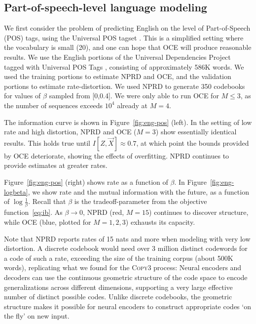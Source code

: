 \documentclass[11pt,letterpaper]{article}
\newif \ifcomment
\newcommand\rljf[1]{\ifcomment{{\color{blue}(#1)}}\else{}\fi}
\begin{document}



\rljf{Some motivation for why this is cool and interesting, maybe in parallel with the Bentz et al entropy paper, and other information theoretic linguistic complexity papers like Koplenig et al, and Dembowski's work}

\subsection{Part-of-speech-level language modeling}

We first consider the problem of predicting English on the level of Part-of-Speech (POS) tags, using the Universal POS tagset \citep{petrov-universal-2012}. 
This is a simplified setting where the vocabulary is small (20), and one can hope that OCE will produce reasonable results.
We use the English portions of the Universal Dependencies Project~\citep{nivre-universal-2017} tagged with Universal POS Tags \citep{petrov-universal-2012}, consisting of approximately 586K words.
We used the training portions to estimate NPRD and OCE, and the validation portions to estimate rate-distortion.
We used NPRD to generate 350 codebooks for values of $\beta$ sampled from [0,0.4].
We were only able to run OCE for $M \leq 3$, as the number of sequences exceeds $10^4$ already at $M=4$.


The information curve is shown in Figure~\ref{fig:eng-pos} (left).
In the setting of low rate and high distortion, NPRD and OCE ($M=3$) show essentially identical results.
This holds true until $I[Z, \overrightarrow{X}] \approx 0.7$, at which point the bounds provided by OCE deteriorate, showing the effects of overfitting.
NPRD continues to provide estimates at greater rates.

Figure~\ref{fig:eng-pos} (right) shows rate as a function of $\beta$.
In Figure~\ref{fig:eng-logbeta}, we show rate and the mutual information with the future, as a function of $\log \frac{1}{\beta}$.
Recall that $\beta$ is the tradeoff-parameter from the objective function~\ref{eq:ib}.
As $\beta \rightarrow 0$, NPRD (red, $M=15$) continues to discover structure, while OCE (blue, plotted for $M=1,2,3$) exhausts its capacity.

Note that NPRD reports rates of 15 nats and more when modeling with very low distortion.
A discrete codebook would need over 3 million distinct codewords for a code of such a rate, exceeding the size of the training corpus (about 500K words), replicating what we found for the \textsc{Copy3} process:
Neural encoders and decoders can use the continuous geometric structure of the code space to encode generalizations across different dimensions, supporting a very large effective number of distinct possible codes.
Unlike discrete codebooks, the geometric structure makes it possible for neural encoders to construct appropriate codes `on the fly' on new input.
\end{document}
